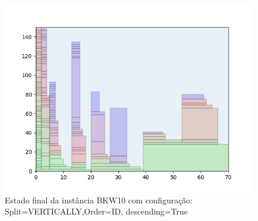 \begin{figure}[H]
    \centering
    \caption[]{Estado final da instância BKW10 com configuração: Split=VERTICALLY,Order=ID, descending=True}
    \label{fig:bkw10-vertically-id-true}
    \includegraphics[scale=0.5]{output/figures/bkw/bkw10/vertically/id/true/000}
\end{figure}